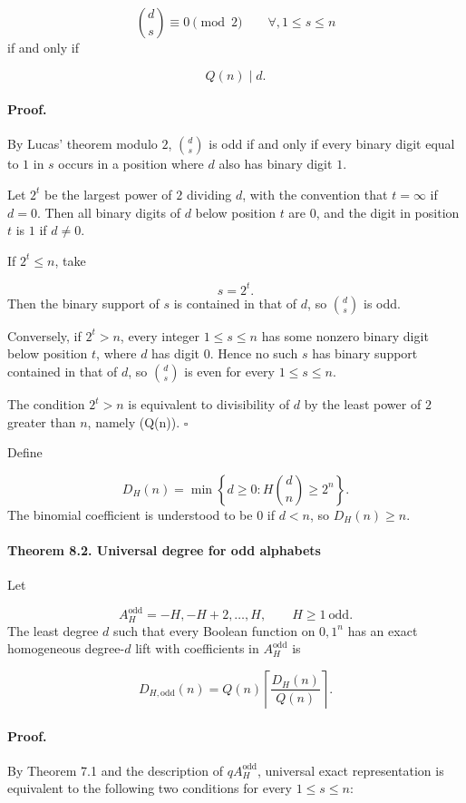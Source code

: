 \documentclass[11pt]{article}
\theoremstyle{definition}
\begin{document}
\[
\binom ds\equiv0\pmod2
\qquad
\forall,1\le s\le n
\]
if and only if

\[
Q(n)\mid d.
\]
\paragraph{Proof.}
By Lucas' theorem modulo $2$, $\binom ds$ is odd if and only if every binary digit equal to $1$ in $s$ occurs in a position where $d$ also has binary digit $1$.

Let $2^t$ be the largest power of $2$ dividing $d$, with the convention that $t=\infty$ if $d=0$. Then all binary digits of $d$ below position $t$ are $0$, and the digit in position $t$ is $1$ if $d\ne0$.

If $2^t\le n$, take

\[
s=2^t.
\]
Then the binary support of $s$ is contained in that of $d$, so $\binom ds$ is odd.

Conversely, if $2^t>n$, every integer $1\le s\le n$ has some nonzero binary digit below position $t$, where $d$ has digit $0$. Hence no such $s$ has binary support contained in that of $d$, so $\binom ds$ is even for every $1\le s\le n$.

The condition $2^t>n$ is equivalent to divisibility of $d$ by the least power of $2$ greater than $n$, namely (Q(n)). $\square$

Define

\[
D_H(n)=
\min\left\{
d\ge0:
H\binom dn\ge2^n
\right\}.
\]
The binomial coefficient is understood to be $0$ if $d<n$, so $D_H(n)\ge n$.

\paragraph{Theorem 8.2. Universal degree for odd alphabets}
Let

\[
A_H^{\mathrm{odd}}
=
{-H,-H+2,\dots,H},
\qquad H\ge1\ \text{odd}.
\]
The least degree $d$ such that every Boolean function on ${0,1}^n$ has an exact homogeneous degree-$d$ lift with coefficients in $A_H^{\mathrm{odd}}$ is

\[
D_{H,\mathrm{odd}}(n)
=
Q(n)
\left\lceil
\frac{D_H(n)}{Q(n)}
\right\rceil.
\]
\paragraph{Proof.}
By Theorem 7.1 and the description of $qA_H^{\mathrm{odd}}$, universal exact representation is equivalent to the following two conditions for every $1\le s\le n$:
\end{document}
